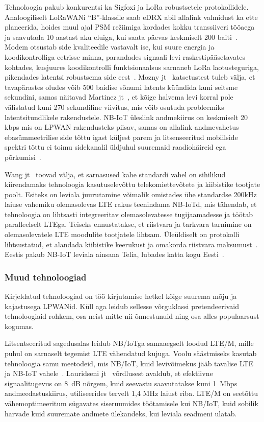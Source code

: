 \documentclass[12pt]{article}
\begin{document}
Tehnoloogia pakub konkurentsi ka Sigfoxi ja LoRa robustsetele protokollidele.
Analoogiliselt LoRaWANi “B”-klassile saab eDRX abil allalink valmidust ka ette planeerida, hoides muul ajal PSM režiimiga kordades kokku transsiiveri tööaega ja saavutada 10 aastast aku eluiga, kui saata päevas keskmiselt 200 baiti~\cite{wanglin}.
Modem otsustab side kvaliteedile vastavalt ise, kui suure energia ja koodikontrolliga eetrisse minna, parandades signaali levi raskestipääsetavates kohtades, kusjuures koodikontrolli funktsionaalsus sarnaneb LoRa laotusteguriga, pikendades latentsi robustsema side eest~\cite{martinez}.
Mozny jt~\cite{mozny} katsetustest tuleb välja, et tavapärastes oludes võib 500 baidise sõnumi latents küündida kuni seitsme sekundini, samas näitavad Martinez jt~\cite{martinez}, et kõige halvema levi korral pole välistatud kuni 270 sekundiline viivitus, mis võib osutuda probleemiks latentsitundlikele rakendustele.
NB-IoT üleslink andmekiirus on keskmiselt 20 kbps mis on LPWAN rakendusteks piisav, samas on allalink andmevahetus ebasümmeetrilise side tõttu igast küljest parem ja litsenseeritud mobiilside spektri tõttu ei toimu sidekanalil üldjuhul suuremaid raadiohäireid ega põrkumisi~\cite{wanglin}.

Wang jt~\cite{wanglin} toovad välja, et sarnasused kahe standardi vahel on sihilikud kiirendamaks tehnoloogia kasutuselevõttu telekomiettevõtete ja kiibistike tootjate poolt.
Esiteks on leviala juurutamine võimalik omistades ühe standardse 200kHz laiuse vahemiku olemasolevas LTE rakus teenindama NB-IoTd, mis tähendab, et tehnoloogia on lihtsasti integreeritav olemasolevatesse tugijaamadesse ja töötab paralleelselt LTEga.
Teiseks ennustatakse, et riistvara ja tarkvara tarnimine on olemasolevatele LTE moodulite tootjatele lihtsam.
Üleüldiselt on protokolli lihtsustatud, et alandada kiibistike keerukust ja omakorda riistvara maksumust~\cite{xuyao}.
Eestis pakub NB-IoT leviala ainsana Telia, lubades katta kogu Eesti~\cite{nbtelia}.

\subsubsection{Muud tehnoloogiad}

Kirjeldatud tehnoloogiad on töö kirjutamise hetkel kõige suurema mõju ja kajastusega LPWANid.
Küll aga leidub sellesse võrguklassi pretendeerivaid tehnoloogiaid rohkem, osa neist mitte nii õnnestunuid ning osa alles populaarsust kogumas.

Litsentseeritud sagedusalas leidub NB\-/IoTga samaaegselt loodud LTE\-/M, mille puhul on sarnaselt tegemist LTE vähendatud kujuga.
Voolu säästmiseks kasutab tehnoloogia samu meetodeid, mis NB\-/IoT, kuid levivõimekus jääb tavalise LTE ja NB-IoT vahele~\cite{benhiba2018comparative}.
Lauridseni jt~\cite{lauridsen2016coverage} võrdlusest avaldub, et efektiivne signaalitugevus on 8~dB nõrgem, kuid seevastu saavutatakse kuni 1~Mbps andmeedastuskiirus, utiliseerides tervelt 1,4 MHz laiust riba.
LTE\-/M on seetõttu vähemoptimeeritum sügavates siseruumides töötamisele kui NB\-/IoT, kuid sobilik harvade kuid suuremate andmete ülekandeks, kui leviala seadmeni ulatab.
\end{document}
